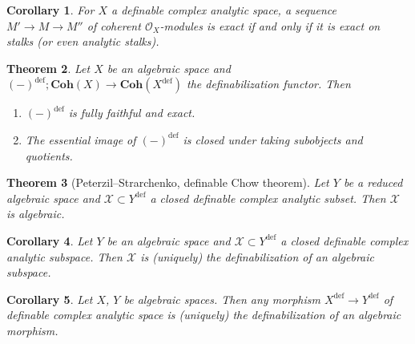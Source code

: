 \documentclass{amsart}
\newtheorem{theorem}{Theorem}[section]
\newtheorem{corollary}[theorem]{Corollary}
\theoremstyle{definition}
\numberwithin{equation}{section}
\newcommand{\definable}{\mathrm{def}}
\begin{document}
\begin{corollary}
    For $X$ a definable complex analytic space,
    a sequence $M' \to M \to M''$ of coherent $\mathcal{O}_X$-modules
    is exact if and only if it is exact on stalks (or even analytic stalks).
\end{corollary}

\begin{theorem}
    Let $X$ be an algebraic space and 
    $(-)^{\definable}; \mathbf{Coh}(X) \to \mathbf{Coh}(X^{\definable})$ the definabilization functor.
    Then 
    \begin{enumerate}[label = {(\arabic*)}]
        \item $(-)^{\definable}$ is fully faithful and exact.
        \item The essential image of $(-)^{\definable}$ is closed under taking subobjects and quotients.
    \end{enumerate}
\end{theorem}

\begin{theorem}[Peterzil--Strarchenko, definable Chow theorem]
    Let $Y$ be a reduced algebraic space and 
    $\mathcal{X} \subset Y^{\definable}$ a closed definable complex analytic subset.
    Then $\mathcal{X}$ is algebraic.
\end{theorem}

\begin{corollary}
    Let $Y$ be an algebraic space and $\mathcal{X} \subset Y^{\definable}$ a closed definable complex analytic subspace.
    Then $\mathcal{X}$ is (uniquely) the definabilization of an algebraic subspace.
\end{corollary}

\begin{corollary}
    Let $X$, $Y$ be algebraic spaces.
    Then any morphism $X^{\definable} \to Y^{\definable}$ of definable complex analytic space is (uniquely) the definabilization of an algebraic morphism.
\end{corollary}
\end{document}
